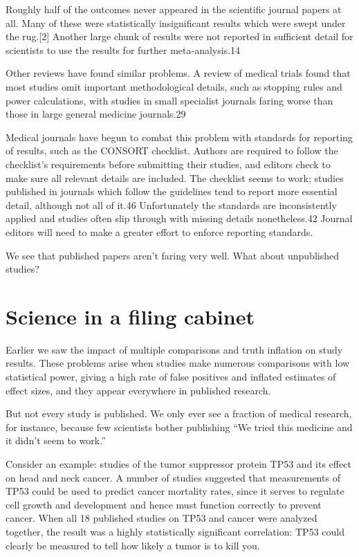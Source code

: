 Roughly half of the outcomes never appeared in the scientific journal papers at all. Many of these were statistically insignificant results which were swept under the rug.[2] Another large chunk of results were not reported in sufficient detail for scientists to use the results for further meta-analysis.14

Other reviews have found similar problems. A review of medical trials found that most studies omit important methodological details, such as stopping rules and power calculations, with studies in small specialist journals faring worse than those in large general medicine journals.29

Medical journals have begun to combat this problem with standards for reporting of results, such as the CONSORT checklist. Authors are required to follow the checklist’s requirements before submitting their studies, and editors check to make sure all relevant details are included. The checklist seems to work; studies published in journals which follow the guidelines tend to report more essential detail, although not all of it.46 Unfortunately the standards are inconsistently applied and studies often slip through with missing details nonetheless.42 Journal editors will need to make a greater effort to enforce reporting standards.

We see that published papers aren’t faring very well. What about unpublished studies?

\section{Science in a filing cabinet}
\label{chp10:sciencecabinet}


Earlier we saw the impact of multiple comparisons and truth inflation on study results. These problems arise when studies make numerous comparisons with low statistical power, giving a high rate of false positives and inflated estimates of effect sizes, and they appear everywhere in published research.

But not every study is published. We only ever see a fraction of medical research, for instance, because few scientists bother publishing “We tried this medicine and it didn’t seem to work.”

Consider an example: studies of the tumor suppressor protein TP53 and its effect on head and neck cancer. A number of studies suggested that measurements of TP53 could be used to predict cancer mortality rates, since it serves to regulate cell growth and development and hence must function correctly to prevent cancer. When all 18 published studies on TP53 and cancer were analyzed together, the result was a highly statistically significant correlation: TP53 could clearly be measured to tell how likely a tumor is to kill you.

